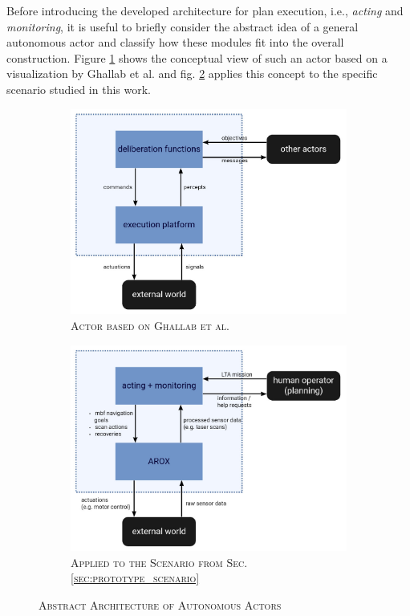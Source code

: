 \documentclass[english, master, utf8]{base/thesis_KBS}
\begin{document}
Before introducing the developed architecture for plan execution, i.e., \textit{acting} and \textit{monitoring}, it is useful to briefly consider the abstract idea of a general autonomous actor and
classify how these modules fit into the overall construction. Figure \ref{fig:GNT_actor} shows the conceptual view of such an actor based on a visualization by Ghallab et al.
and fig. \ref{fig:MSC_actor} applies this concept to the specific scenario studied in this work.
\begin{figure}[H]
    \centering
    \begin{subfigure}[b]{0.49\textwidth}
        \centering
        \includegraphics[width=\textwidth]{pics/GNT_actor_new.png}
        \caption{\textsc{Actor based on Ghallab et al. \cite{GNT:2016}}}
        \label{fig:GNT_actor}
    \end{subfigure}
    \hfill
    \begin{subfigure}[b]{0.49\textwidth}
        \centering
        \includegraphics[width=\textwidth]{pics/MSC_actor_new.png}
        \caption{\textsc{Applied to the Scenario from Sec. \ref{sec:prototype_scenario}}}
        \label{fig:MSC_actor}
    \end{subfigure}
\caption{\textsc{Abstract Architecture of Autonomous Actors}}
\label{fig:abstract_actor}
\end{figure}
\end{document}
